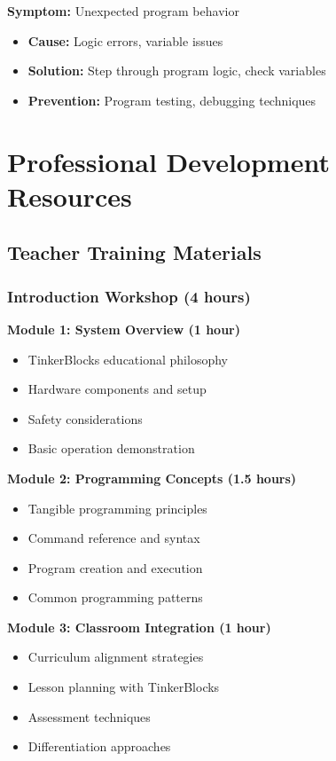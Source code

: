 \textbf{Symptom:} Unexpected program behavior
\begin{itemize}
    \item \textbf{Cause:} Logic errors, variable issues
    \item \textbf{Solution:} Step through program logic, check variables
    \item \textbf{Prevention:} Program testing, debugging techniques
\end{itemize}

\section{Professional Development Resources}

\subsection{Teacher Training Materials}

\subsubsection{Introduction Workshop (4 hours)}

\textbf{Module 1: System Overview (1 hour)}
\begin{itemize}
    \item TinkerBlocks educational philosophy
    \item Hardware components and setup
    \item Safety considerations
    \item Basic operation demonstration
\end{itemize}

\textbf{Module 2: Programming Concepts (1.5 hours)}
\begin{itemize}
    \item Tangible programming principles
    \item Command reference and syntax
    \item Program creation and execution
    \item Common programming patterns
\end{itemize}

\textbf{Module 3: Classroom Integration (1 hour)}
\begin{itemize}
    \item Curriculum alignment strategies
    \item Lesson planning with TinkerBlocks
    \item Assessment techniques
    \item Differentiation approaches
\end{itemize}

